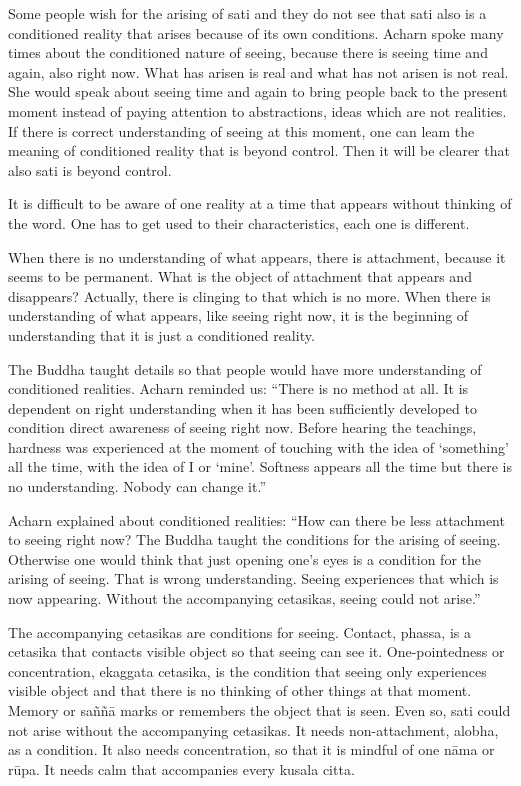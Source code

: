 Some people wish for the arising of sati and they do not see that sati also is a 
conditioned reality that arises because of its own conditions. Acharn spoke 
many times about the conditioned nature of seeing, because there is seeing time 
and again, also right now. What has arisen is real and what has not arisen is not 
real. She would speak about seeing time and again to bring people back to the 
present moment instead of paying attention to abstractions, ideas which are not 
realities. If there is correct understanding of seeing at this moment, one can 
leam the meaning of conditioned reality that is beyond control. Then it will be 
clearer that also sati is beyond control. 

It is difficult to be aware of one reality at a time that appears without thinking of 
the word. One has to get used to their characteristics, each one is different. 

When there is no understanding of what appears, there is attachment, because it 
seems to be permanent. What is the object of attachment that appears and disappears? Actually, there is clinging to that which is no more. When there is understanding of what appears, like seeing right now, it is the beginning of understanding that it is just a conditioned reality. 

The Buddha taught details so that people would have more understanding of 
conditioned realities. Acharn reminded us: ``There is no method at all. It is dependent on right understanding when it has been sufficiently developed to condition direct awareness of seeing right now. Before hearing the teachings, hardness was experienced at the moment of touching with the idea of `something' 
all the time, with the idea of I or `mine'. Softness appears all the time but there 
is no understanding. Nobody can change it.'' 

Acharn explained about conditioned realities: ``How can there be less attachment to seeing right now? The Buddha taught the conditions for the arising of 
seeing. Otherwise one would think that just opening one's eyes is a condition 
for the arising of seeing. That is wrong understanding. Seeing experiences that 
which is now appearing. Without the accompanying cetasikas, seeing could not 
arise.'' 

The accompanying cetasikas are conditions for seeing. Contact, phassa, is a 
cetasika that contacts visible object so that seeing can see it. One-pointedness or 
concentration, ekaggata cetasika, is the condition that seeing only experiences 
visible object and that there is no thinking of other things at that moment. 
Memory or saññā marks or remembers the object that is seen. Even so, sati 
could not arise without the accompanying cetasikas. It needs non-attachment, 
alobha, as a condition. It also needs concentration, so that it is mindful of one 
nāma or rūpa. It needs calm that accompanies every kusala citta. 

